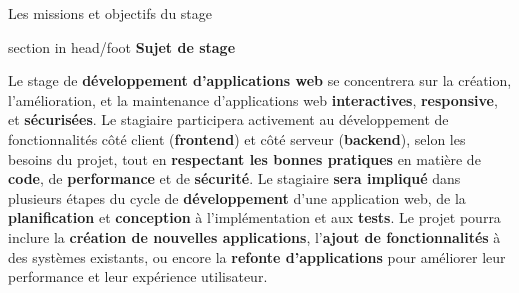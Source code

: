 \documentclass{beamer}
\begin{document}
\begin{frame}[label=sujet]{Les missions et objectifs du stage}

	\begin{beamercolorbox}[wd=\paperwidth,ht=1.5em,dp=0.5em,leftskip=0.5cm]{section in head/foot}
  		\large \textbf{Sujet de stage}
	\end{beamercolorbox}
	\vspace{0.2em}
	
	\begin{center}
  		\begin{minipage}{0.9\textwidth}				

    		\hspace{0.5cm} \small Le stage de \textbf{développement d'applications web} se concentrera sur la création, l'amélioration, et la maintenance d'applications web \textbf{interactives}, \textbf{responsive}, et \textbf{sécurisées}. Le stagiaire participera activement au développement de fonctionnalités côté client (\textbf{frontend}) et côté serveur (\textbf{backend}), selon les besoins du projet, tout en \textbf{respectant les bonnes pratiques} en matière de \textbf{code}, de \textbf{performance} et de \textbf{sécurité}. Le stagiaire \textbf{sera impliqué} dans plusieurs étapes du cycle de \textbf{développement} d'une application web, de la \textbf{planification} et \textbf{conception} à l'implémentation et aux \textbf{tests}. Le projet pourra inclure la \textbf{création de nouvelles applications}, l'\textbf{ajout de fonctionnalités} à des systèmes existants, ou encore la \textbf{refonte d'applications} pour améliorer leur performance et leur expérience utilisateur.
				
  		\end{minipage}
	\end{center}
	\vfill
\end{frame}
\end{document}
